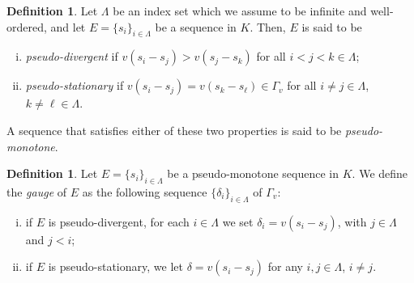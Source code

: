\documentclass{article}
\theoremstyle{definition}\newtheorem{Def}[equation]{Definition}
\theoremstyle{definition}\newtheorem{Ques}[equation]{Question}
\theoremstyle{definition}\newtheorem{Conj}[equation]{Conjecture}
\theoremstyle{definition}\newtheorem{Not}[equation]{Notation}
\numberwithin{equation}{section}
\begin{document}
\begin{Def}\label{pseudo-monotone def}
Let $\Lambda$ be an index set which we assume to be infinite and well-ordered, and let $E = \{s_i\}_{i \in \Lambda}$ be a sequence in $K$. Then, $E$ is said to be
\begin{enumerate}[(i)]
\item \textit{pseudo-divergent} if $v(s_{i}-s_j)>v(s_{j}-s_{k})$ for all $i<j<k\in\Lambda$;
\item \textit{pseudo-stationary} if $v(s_i-s_j)=v(s_{k}-s_{\ell})\in\Gamma_v$ for all $i\neq j \in \Lambda$, $k \neq \ell \in \Lambda$.
\end{enumerate}
A sequence that satisfies either of these two properties is said to be \textit{pseudo-monotone}.
\end{Def}

\begin{Def}\label{Gauge def} Let $E = \{s_i\}_{i \in \Lambda}$ be a pseudo-monotone sequence in $K$. We define the \emph{gauge} of $E$ as the following sequence $\{\delta_i\}_{i \in \Lambda}$ of $\Gamma_v$:
\begin{enumerate}[(i)]
\item if $E$ is pseudo-divergent, for each $i \in \Lambda$ we set $\delta_i=v(s_{i}-s_{j})$, with $j\in\Lambda$ and $j<i$;
\item if $E$ is pseudo-stationary, we let $\delta= v(s_{i}-s_{j})$ for any $i,j\in\Lambda$, $i \ne j$.
\end{enumerate}
\end{Def}
\end{document}
